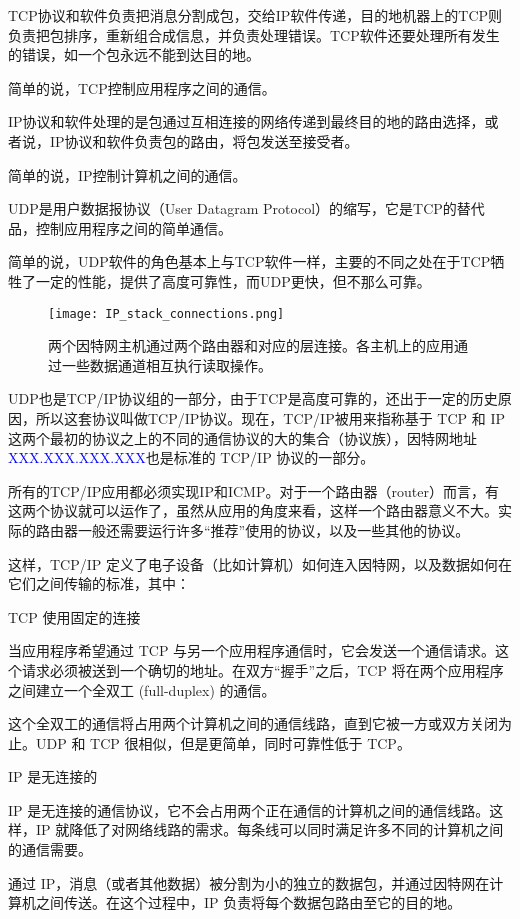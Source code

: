 \begin{compactitem}
\item TCP协议和软件负责把消息分割成包，交给IP软件传递，目的地机器上的TCP则负责把包排序，重新组合成信息，并负责处理错误。TCP软件还要处理所有发生的错误，如一个包永远不能到达目的地。

简单的说，TCP控制应用程序之间的通信。

\item IP协议和软件处理的是包通过互相连接的网络传递到最终目的地的路由选择，或者说，IP协议和软件负责包的路由，将包发送至接受者。

简单的说，IP控制计算机之间的通信。


\item UDP是用户数据报协议（User Datagram Protocol）的缩写，它是TCP的替代品，控制应用程序之间的简单通信。

简单的说，UDP软件的角色基本上与TCP软件一样，主要的不同之处在于TCP牺牲了一定的性能，提供了高度可靠性，而UDP更快，但不那么可靠。
\end{compactitem}

\begin{figure}[!ht]
\centering
\texttt{[image: IP\_stack\_connections.png]}
\caption{两个因特网主机通过两个路由器和对应的层连接。各主机上的应用通过一些数据通道相互执行读取操作。}
\label{IP_stack_connections}
\end{figure}



UDP也是TCP/IP协议组的一部分，由于TCP是高度可靠的，还出于一定的历史原因，所以这套协议叫做TCP/IP协议。现在，TCP/IP被用来指称基于 TCP 和 IP 这两个最初的协议之上的不同的通信协议的大的集合（协议族），因特网地址\textcolor{Blue}{XXX.XXX.XXX.XXX}也是标准的 TCP/IP 协议的一部分。


所有的TCP/IP应用都必须实现IP和ICMP。对于一个路由器（router）而言，有这两个协议就可以运作了，虽然从应用的角度来看，这样一个路由器意义不大。实际的路由器一般还需要运行许多“推荐”使用的协议，以及一些其他的协议。

这样，TCP/IP 定义了电子设备（比如计算机）如何连入因特网，以及数据如何在它们之间传输的标准，其中：

\begin{compactitem}
\item TCP 使用固定的连接

当应用程序希望通过 TCP 与另一个应用程序通信时，它会发送一个通信请求。这个请求必须被送到一个确切的地址。在双方“握手”之后，TCP 将在两个应用程序之间建立一个全双工 (full-duplex) 的通信。

这个全双工的通信将占用两个计算机之间的通信线路，直到它被一方或双方关闭为止。UDP 和 TCP 很相似，但是更简单，同时可靠性低于 TCP。

\item IP 是无连接的

IP 是无连接的通信协议，它不会占用两个正在通信的计算机之间的通信线路。这样，IP 就降低了对网络线路的需求。每条线可以同时满足许多不同的计算机之间的通信需要。

通过 IP，消息（或者其他数据）被分割为小的独立的数据包，并通过因特网在计算机之间传送。在这个过程中，IP 负责将每个数据包路由至它的目的地。
\end{compactitem}

